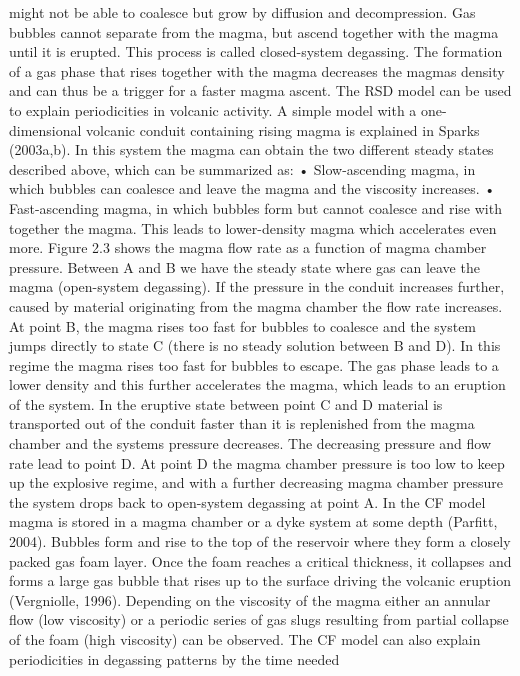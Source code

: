 \documentclass  [
  paper    = a4,
  BCOR     = 10mm,
  twoside,
  fontsize = 12pt,
  fleqn,
  toc      = bibnumbered,
  toc      = listofnumbered,
  numbers  = noendperiod,
  headings = normal,
  listof   = leveldown,
  version  = 3.03
]                                       {scrreprt}
\begin{document}
{	might not be able to coalesce but grow by diffusion and decompression. Gas
	bubbles cannot separate from the magma, but ascend together with the magma
	until it is erupted. This process is called closed-system degassing. The formation
	of a gas phase that rises together with the magma decreases the magmas density
	and can thus be a trigger for a faster magma ascent.
	The RSD model can be used to explain periodicities in volcanic activity. A
	simple model with a one-dimensional volcanic conduit containing rising magma
	is explained in Sparks (2003a,b). In this system the magma can obtain the two
	different steady states described above, which can be summarized as:
	• Slow-ascending magma, in which bubbles can coalesce and leave the magma
	and the viscosity increases.
	• Fast-ascending magma, in which bubbles form but cannot coalesce and
	rise with together the magma. This leads to lower-density magma which
	accelerates even more.
Figure 2.3 shows the magma flow rate as a function of magma chamber pressure.
Between A and B we have the steady state where gas can leave the magma
(open-system degassing). If the pressure in the conduit increases further, caused
by material originating from the magma chamber the flow rate increases. At
point B, the magma rises too fast for bubbles to coalesce and the system jumps
directly to state C (there is no steady solution between B and D). In this regime
the magma rises too fast for bubbles to escape. The gas phase leads to a lower
density and this further accelerates the magma, which leads to an eruption of
the system. In the eruptive state between point C and D material is transported
out of the conduit faster than it is replenished from the magma chamber and
the systems pressure decreases. The decreasing pressure and flow rate lead to
point D. At point D the magma chamber pressure is too low to keep up the
explosive regime, and with a further decreasing magma chamber pressure the
system drops back to open-system degassing at point A.
In the CF model magma is stored in a magma chamber or a dyke system at
some depth (Parfitt, 2004). Bubbles form and rise to the top of the reservoir
where they form a closely packed gas foam layer. Once the foam reaches a critical
thickness, it collapses and forms a large gas bubble that rises up to the surface
driving the volcanic eruption (Vergniolle, 1996). Depending on the viscosity of
the magma either an annular flow (low viscosity) or a periodic series of gas slugs
resulting from partial collapse of the foam (high viscosity) can be observed. The
CF model can also explain periodicities in degassing patterns by the time needed
}
\end{document}
